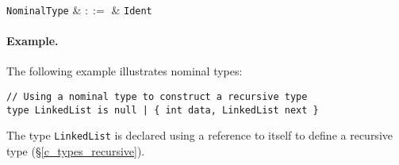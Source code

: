 \begin{syntax}
  \verb+NominalType+ & $::=$ & \verb+Ident+\\
\end{syntax}

\paragraph{Example.} The following example illustrates nominal types:
\begin{lstlisting}
// Using a nominal type to construct a recursive type
type LinkedList is null | { int data, LinkedList next }
\end{lstlisting}
The type \lstinline{LinkedList} is declared using a reference to itself to define a recursive type (\S\ref{c_types_recursive}).  


%
%



